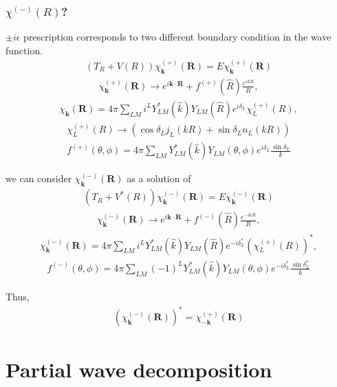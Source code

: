 \documentclass[10pt]{book}
\def\bm{\boldsymbol}
\newcommand{\bea}{\begin{eqnarray}}
\newcommand{\eea}{\end{eqnarray}}
\def\vk{{\bm k}}
\def\vR{{\bm R}}
\begin{document}
\subsection{$\chi^{(-)}(R)$?} 
$\pm i\epsilon$ prescription corresponds to two different boundary condition in the wave function.
\bea 
(T_R+V(R))\chi_\vk^{(+)}(\vR)=E\chi_\vk^{(+)}(\vR)
\eea 
\bea 
\chi^{(+)}_\vk(\vR)\to e^{i\vk\cdot\vR}+f^{(+)}(\hat{R})\frac{e^{ikR}}{R},
\eea 
\bea 
\chi_{\vk}(\vR)=4\pi\sum_{LM}i^L Y_{LM}^*(\hat{k})Y_{LM}(\hat{R}) e^{i\delta_L} \chi_L^{(+)}(R),
\eea 
\bea 
\chi_L^{(+)}(R)\to (\cos\delta_L j_L(kR)+\sin\delta_L n_L(kR))
\eea 
\bea 
f^{(+)}(\theta,\phi)= 4\pi\sum_{LM} Y^*_{LM}(\hat{k}) Y_{LM}(\theta,\phi) 
                   e^{i\delta_L}\frac{\sin\delta_L}{k}
\eea 

we can consider $\chi_\vk^{(-)}(\vR)$ as a solution of
\bea 
(T_R+V^*(R))\chi_\vk^{(-)}(\vR)=E\chi_\vk^{(-)}(\vR)
\eea 
\bea 
\chi^{(-)}_\vk(\vR)\to e^{i\vk\cdot\vR}+f^{(-)}(\hat{R})\frac{e^{-ikR}}{R},
\eea 
\bea 
\chi^{(-)}_{\vk}(\vR)=4\pi\sum_{LM}i^L Y_{LM}^*(\hat{k})Y_{LM}(\hat{R}) e^{-i\delta^*_L} (\chi_L^{(+)}(R))^*,
\eea 
\bea 
f^{(-)}(\theta,\phi)= 4\pi\sum_{LM}(-1)^L Y^*_{LM}(\hat{k}) Y_{LM}(\theta,\phi) 
                   e^{-i\delta^*_L}\frac{\sin\delta^*_L}{k}
\eea 

Thus, 
\bea 
(\chi_{\vk}^{(-)}(\vR))^*=\chi^{(+)}_{-\vk}(\vR)
\eea 


\chapter{Partial wave decomposition}
\end{document}
